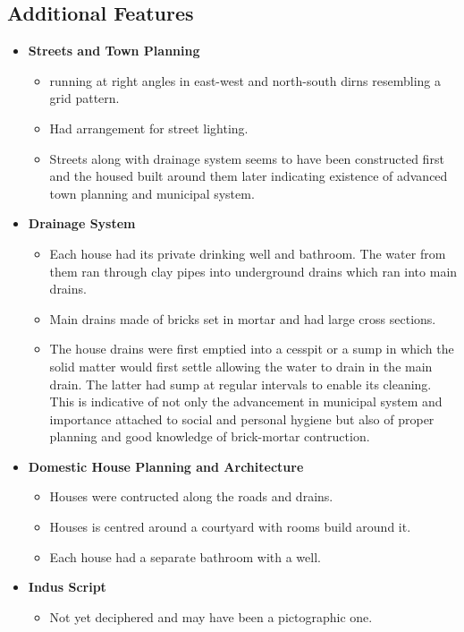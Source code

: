 \documentclass[8pt, a4paper, oneside, twocolumn]{extarticle}
\begin{document}
\subsection{Additional Features}
\begin{itemize}
  \item \textbf{Streets and Town Planning}
    \begin{itemize}
      \item running at right angles in east-west and north-south dirns resembling a grid pattern.
      \item Had arrangement for street lighting.
      \item Streets along with drainage system seems to have been constructed first and the housed built around them later indicating existence of advanced town planning and municipal system.
    \end{itemize}
  \item \textbf{Drainage System}
    \begin{itemize}
      \item Each house had its private drinking well and bathroom. The water from them ran through clay pipes into underground drains which ran into main drains. 
      \item Main drains made of bricks set in mortar and had large cross sections.
      \item The house drains were first emptied into a cesspit or a sump in which the solid matter would first settle allowing the water to drain in the main drain. The latter had sump at regular intervals to enable its cleaning. This is indicative of not only the advancement in municipal system and importance attached to social and personal hygiene but also of proper planning and good knowledge of brick-mortar contruction.
    \end{itemize}
  \item \textbf{Domestic House Planning and Architecture}
    \begin{itemize}
      \item Houses were contructed along the roads and drains.
      \item Houses is centred around a courtyard with rooms build around it.
      \item Each house had a separate bathroom with a well.
    \end{itemize}
  \item \textbf{Indus Script}
    \begin{itemize}
      \item Not yet deciphered and may have been a pictographic one.

\end{itemize}
\end{itemize}
\end{document}

